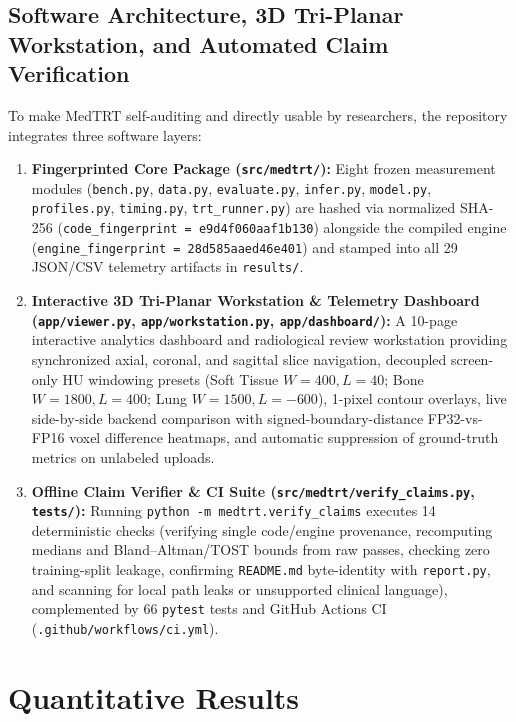 \documentclass[10pt,twocolumn]{article}
\begin{document}
\subsection{Software Architecture, 3D Tri-Planar Workstation, and Automated Claim Verification}
To make MedTRT self-auditing and directly usable by researchers, the repository integrates three software layers:
\begin{enumerate}
    \item \textbf{Fingerprinted Core Package (\texttt{src/medtrt/}):} Eight frozen measurement modules (\texttt{bench.py}, \texttt{data.py}, \texttt{evaluate.py}, \texttt{infer.py}, \texttt{model.py}, \texttt{profiles.py}, \texttt{timing.py}, \texttt{trt\_runner.py}) are hashed via normalized SHA-256 (\texttt{code\_fingerprint = e9d4f060aaf1b130}) alongside the compiled engine (\texttt{engine\_fingerprint = 28d585aaed46e401}) and stamped into all 29 JSON/CSV telemetry artifacts in \texttt{results/}.
    \item \textbf{Interactive 3D Tri-Planar Workstation \& Telemetry Dashboard (\texttt{app/viewer.py}, \texttt{app/workstation.py}, \texttt{app/dashboard/}):} A 10-page interactive analytics dashboard and radiological review workstation providing synchronized axial, coronal, and sagittal slice navigation, decoupled screen-only HU windowing presets (Soft Tissue $W=400, L=40$; Bone $W=1800, L=400$; Lung $W=1500, L=-600$), 1-pixel contour overlays, live side-by-side backend comparison with signed-boundary-distance FP32-vs-FP16 voxel difference heatmaps, and automatic suppression of ground-truth metrics on unlabeled uploads.
    \item \textbf{Offline Claim Verifier \& CI Suite (\texttt{src/medtrt/verify\_claims.py}, \texttt{tests/}):} Running \texttt{python -m medtrt.verify\_claims} executes 14 deterministic checks (verifying single code/engine provenance, recomputing medians and Bland--Altman/TOST bounds from raw passes, checking zero training-split leakage, confirming \texttt{README.md} byte-identity with \texttt{report.py}, and scanning for local path leaks or unsupported clinical language), complemented by 66 \texttt{pytest} tests and GitHub Actions CI (\texttt{.github/workflows/ci.yml}).
\end{enumerate}

\section{Quantitative Results}
\label{sec:results}
\end{document}
